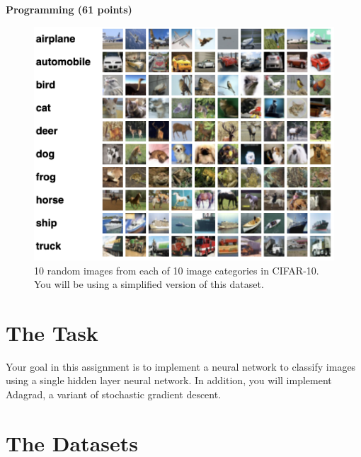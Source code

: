 \documentclass[11pt,addpoints,answers]{exam}
\begin{document}
\begin{your_solution}[height=6cm]

\end{your_solution}

\clearpage
{\LARGE \bf Programming (61 points)}

\begin{figure}[H]
    \centering
    \captionsetup{justification=centering, margin=2cm}
    \includegraphics[scale=0.6]{img/CIFAR-10.png}
    \caption{10 random images from each of 10 image categories in CIFAR-10. You will be using a simplified version of this dataset.}
    \label{fig:grid}
\end{figure}

\section{The Task}
Your goal in this assignment is to implement a neural network to classify images using a single hidden layer neural network. In addition, you will implement Adagrad, a variant of stochastic gradient descent. 

\section{The Datasets}
\label{sec:dataset}

\end{document}
